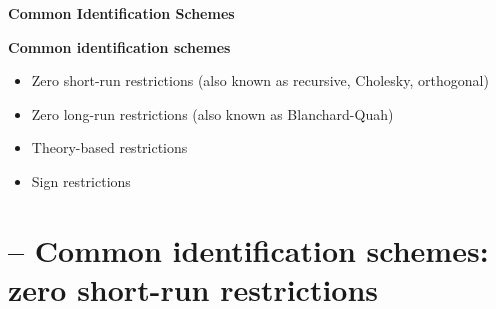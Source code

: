 \documentclass[10pt,handout]{beamer}
\begin{document}
\begin{frame}
\color{title} \centering \Large%
\textbf{Common Identification Schemes}
\end{frame}

\vspace{.1cm}

\begin{frame}
{\textbf{Common identification schemes}}

\begin{itemize}
\item Zero short-run restrictions (also known as recursive, Cholesky,
orthogonal)\medskip

\item Zero long-run restrictions (also known as Blanchard-Quah)\medskip

\item Theory-based restrictions\medskip

\item Sign restrictions
\end{itemize}
\end{frame}

\vspace{.1cm}

\section{ -- Common identification schemes: zero short-run restrictions}
\end{document}
